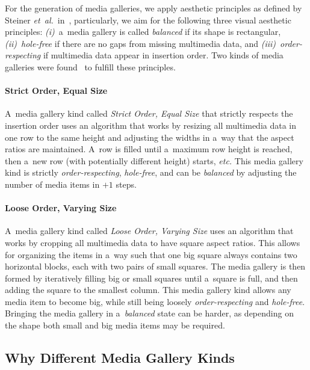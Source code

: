 \documentclass{sig-alternate-somus}
\begin{document}
For the generation of media galleries, we apply aesthetic principles
as defined by Steiner \emph{et~al.}\
in~\cite{steiner2013tocrop,steiner2012aesthetic},
particularly, we aim for the following
three visual aesthetic principles:
\emph{(i)}~a~media gallery is called \emph{balanced}
if its shape is rectangular,
\emph{(ii)}~\emph{hole-free}
if there are no gaps from missing multimedia data,
and \emph{(iii)}~\emph{order-respecting}
if multimedia data appear in insertion order.
Two kinds of media galleries were found~\cite{steiner2013tocrop}
to fulfill these principles.

\paragraph{Strict Order, Equal Size}

A~media gallery kind called \emph{Strict Order, Equal Size}
that strictly respects the insertion order
uses an algorithm that works by resizing all multimedia data
in one row to the same height and adjusting the widths
in a~way that the aspect ratios are maintained.
A~row is filled until a~maximum row height is reached,
then a~new row (with potentially different height) starts, \emph{etc.}
This media gallery kind is strictly \emph{order-respecting},
\emph{hole-free}, and can be \emph{balanced}
by adjusting the number of media items in $+1$ steps.

\paragraph{Loose Order, Varying Size}

A~media gallery kind called \emph{Loose Order, Varying Size}
uses an algorithm that works by cropping all multimedia data
to have square aspect ratios.
This allows for organizing the items in a~way such that one big square
always contains two horizontal blocks,
each with two pairs of small squares.
The media gallery is then formed by iteratively filling
big or small squares until a~square is full,
and then adding the square to the smallest column.
This media gallery kind allows any media item to become big,
while still being loosely \emph{order-respecting} and \emph{hole-free}.
Bringing the media gallery in a~\emph{balanced} state can be harder,
as depending on the shape both small and big
media items may be required.

\subsection{Why Different Media Gallery Kinds}
\end{document}
